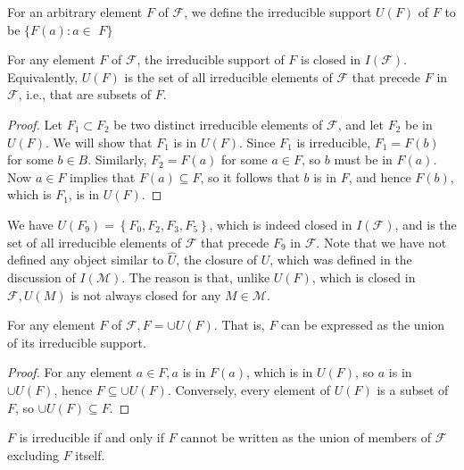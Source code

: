 For an arbitrary element $F$ of $\mathcal{F}$, we define the irreducible support $U(F)$ of $F$ to be $\{F(a): a \in$ $F\}$

\begin{lemma}\label{lem_2_4}
For any element $F$ of $\mathcal{F}$, the irreducible support of $F$ is closed in $I(\mathcal{F})$. Equivalently, $U(F)$ is the set of all irreducible elements of $\mathcal{F}$ that precede $F$ in $\mathcal{F}$, i.e., that are subsets of $F$.
\end{lemma}

\begin{proof}
Let $F_1 \subset F_2$ be two distinct irreducible elements of $\mathcal{F}$, and let $F_2$ be in $U(F)$. We will show that $F_1$ is in $U(F)$. Since $F_1$ is irreducible, $F_1=F(b)$ for some $b \in B$. Similarly, $F_2=F(a)$ for some $a \in F$, so $b$ must be in $F(a)$. Now $a \in F$ implies that $F(a) \subseteq F$, so it follows that $b$ is in $F$, and hence $F(b)$, which is $F_1$, is in $U(F)$.
\end{proof}

\begin{exmp}\label{exmp_2_6}
    We have $U\left(F_9\right)=\left\{F_0, F_2, F_3, F_5\right\}$, which is indeed closed in $I(\mathcal{F})$, and is the set of all irreducible elements of $\mathcal{F}$ that precede $F_9$ in $\mathcal{F}$. Note that we have not defined any object similar to $\hat{U}$, the closure of $U$, which was defined in the discussion of $I(\mathcal{M})$. The reason is that, unlike $U(F)$, which is closed in $\mathcal{F}, U(M)$ is not always closed for any $M \in \mathcal{M}$.
\end{exmp}

\begin{lemma}\label{lem_2_5}
 For any element $F$ of $\mathcal{F}, F=\cup U(F)$. That is, $F$ can be expressed as the union of its irreducible support.   
\end{lemma}

\begin{proof}
    For any element $a \in F, a$ is in $F(a)$, which is in $U(F)$, so $a$ is in $\cup U(F)$, hence $F \subseteq \cup U(F)$. Conversely, every element of $U(F)$ is a subset of $F$, so $\cup U(F) \subseteq F$.
\end{proof}

\begin{lemma}\label{lem_2_6}
    $F$ is irreducible if and only if $F$ cannot be written as the union of members of $\mathcal{F}$ excluding $F$ itself.
\end{lemma}

